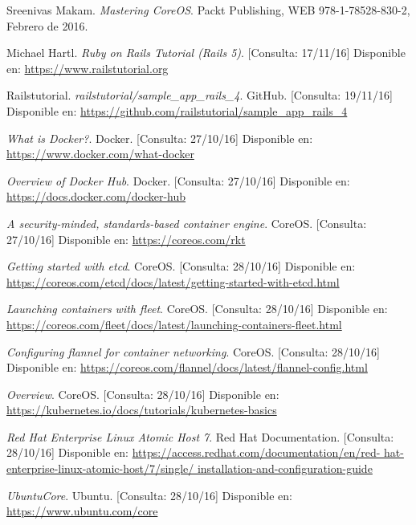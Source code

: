 \begin{thebibliography}{9}

Sreenivas Makam.
\textit{Mastering CoreOS}. 
Packt Publishing, WEB 978-1-78528-830-2, Febrero de 2016.

Michael Hartl.
\textit{Ruby on Rails Tutorial (Rails 5)}. [Consulta: 17/11/16]
Disponible en: \url{https://www.railstutorial.org}

Railstutorial.
\textit{railstutorial/sample\_app\_rails\_4}. GitHub. [Consulta: 19/11/16]
Disponible en: \url{https://github.com/railstutorial/sample\_app\_rails\_4}

\textit{What is Docker?}. Docker. [Consulta: 27/10/16]
Disponible en: \url{https://www.docker.com/what-docker}

\textit{Overview of Docker Hub}. Docker. [Consulta: 27/10/16]
Disponible en: \url{https://docs.docker.com/docker-hub}

\textit{A security-minded, standards-based container engine}. CoreOS. [Consulta: 27/10/16]
Disponible en: \url{https://coreos.com/rkt}

\textit{Getting started with etcd}. CoreOS. [Consulta: 28/10/16]
Disponible en: \url{https://coreos.com/etcd/docs/latest/getting-started-with-etcd.html}

\textit{Launching containers with fleet}. CoreOS. [Consulta: 28/10/16]
Disponible en: \url{https://coreos.com/fleet/docs/latest/launching-containers-fleet.html}

\textit{Configuring flannel for container networking}. CoreOS. [Consulta: 28/10/16]
Disponible en: \url{https://coreos.com/flannel/docs/latest/flannel-config.html}

\textit{Overview}. CoreOS. [Consulta: 28/10/16]
Disponible en: \url{https://kubernetes.io/docs/tutorials/kubernetes-basics}

\textit{Red Hat Enterprise Linux Atomic Host 7}. 
Red Hat Documentation. [Consulta: 28/10/16]
Disponible en: \url{https://access.redhat.com/documentation/en/red-
hat-enterprise-linux-atomic-host/7/single/
installation-and-configuration-guide}

\textit{UbuntuCore}. 
Ubuntu. [Consulta: 28/10/16]
Disponible en: \url{https://www.ubuntu.com/core}


\end{thebibliography}
